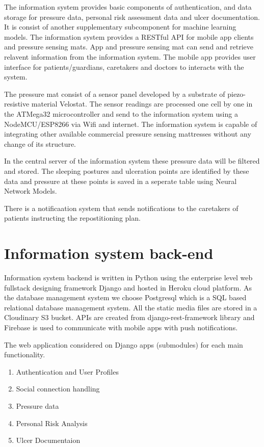 
The information system provides basic components of authentication, and data storage for pressure data, personal risk assessment data and ulcer documentation. It is consist of another supplementary subcomponent for machine learning models. The information system provides a RESTful API for mobile app clients and pressure sensing mats. App and pressure sensing mat can send and retrieve relavent information from the information system. The mobile app provides user interface for patients/guardians, caretakers and doctors to interacts with the system.

The pressure mat consist of a sensor panel developed by a substrate of piezo-resistive material Velostat\textsuperscript{\textregistered}. The sensor readings are processed one cell by one in the ATMega32\textsuperscript{\textregistered} microcontroller and send to the information system using a NodeMCU/ESP8266\textsuperscript{\textregistered} via Wifi and internet. The information system is capable of integrating other available commercial pressure sensing mattresses without any change of its structure.

In the central server of the information system these pressure data will be filtered and stored. The sleeping postures and ulceration points are identified by these data and pressure at these points is saved in a seperate table using Neural Network Models.

There is a notificaation system that sends notifications to the caretakers of patients instructing the repostitioning plan.


\section{Information system back-end}

Information system backend is written in Python using the enterprise level web fullstack designing framework Django\textsuperscript{\textregistered} and hosted in Heroku\textsuperscript{\textregistered} cloud platform. As the database management system we choose Postgresql which is a SQL based relational database management system. All the static media files are stored in a Cloudinary S3 bucket\textsuperscript{\textregistered}. APIs are created from django-rest-framework library and Firebase\textsuperscript{\textregistered} is used to communicate with mobile apps with push notifications. 

The web application considered on Django apps (submodules) for each main functionality.
\begin{enumerate}
	\item Authentication and User Profiles
	\item Social connection handling
	\item Pressure data
	\item Personal Risk Analysis
	\item Ulcer Documentaion
\end{enumerate}

